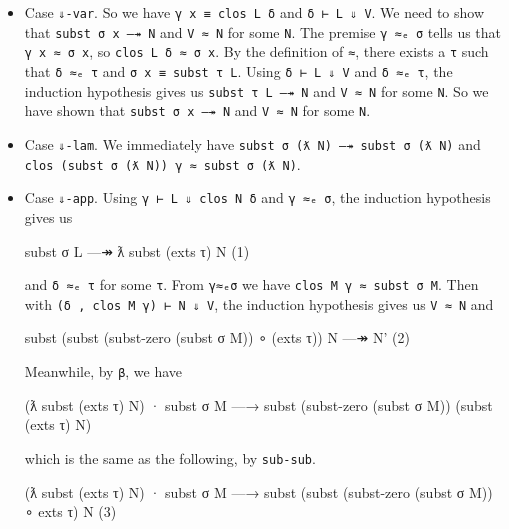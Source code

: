 \begin{itemize}
\item
  Case \texttt{⇓-var}. So we have \texttt{γ\ x\ ≡\ clos\ L\ δ} and
  \texttt{δ\ ⊢\ L\ ⇓\ V}. We need to show that
  \texttt{subst\ σ\ x\ —↠\ N} and \texttt{V\ ≈\ N} for some \texttt{N}.
  The premise \texttt{γ\ ≈ₑ\ σ} tells us that \texttt{γ\ x\ ≈\ σ\ x}, so
  \texttt{clos\ L\ δ\ ≈\ σ\ x}. By the definition of \texttt{≈}, there
  exists a \texttt{τ} such that \texttt{δ\ ≈ₑ\ τ} and
  \texttt{σ\ x\ ≡\ subst\ τ\ L}. Using \texttt{δ\ ⊢\ L\ ⇓\ V} and
  \texttt{δ\ ≈ₑ\ τ}, the induction hypothesis gives us
  \texttt{subst\ τ\ L\ —↠\ N} and \texttt{V\ ≈\ N} for some \texttt{N}.
  So we have shown that \texttt{subst\ σ\ x\ —↠\ N} and \texttt{V\ ≈\ N}
  for some \texttt{N}.
\item
  Case \texttt{⇓-lam}. We immediately have
  \texttt{subst\ σ\ (ƛ\ N)\ —↠\ subst\ σ\ (ƛ\ N)} and
  \texttt{clos\ (subst\ σ\ (ƛ\ N))\ γ\ ≈\ subst\ σ\ (ƛ\ N)}.
\item
  Case \texttt{⇓-app}. Using \texttt{γ\ ⊢\ L\ ⇓\ clos\ N\ δ} and
  \texttt{γ\ ≈ₑ\ σ}, the induction hypothesis gives us

  \begin{myDisplay}
    subst σ L —↠ ƛ subst (exts τ) N                                     (1)
  \end{myDisplay}

  and \texttt{δ\ ≈ₑ\ τ} for some \texttt{τ}. From \texttt{γ≈ₑσ} we have
  \texttt{clos\ M\ γ\ ≈\ subst\ σ\ M}. Then with
  \texttt{(δ\ ,\textquotesingle{}\ clos\ M\ γ)\ ⊢\ N\ ⇓\ V}, the
  induction hypothesis gives us \texttt{V\ ≈\ N\textquotesingle{}} and

  \begin{myDisplay}
    subst (subst (subst-zero (subst σ M)) ∘ (exts τ)) N —↠ N'         (2)
  \end{myDisplay}

  Meanwhile, by \texttt{β}, we have

  \begin{myDisplay}
    (ƛ subst (exts τ) N) · subst σ M
    —→ subst (subst-zero (subst σ M)) (subst (exts τ) N)
  \end{myDisplay}

  which is the same as the following, by \texttt{sub-sub}.

  \begin{myDisplay}
    (ƛ subst (exts τ) N) · subst σ M
    —→ subst (subst (subst-zero (subst σ M)) ∘ exts τ) N              (3)
  \end{myDisplay}


\end{itemize}
